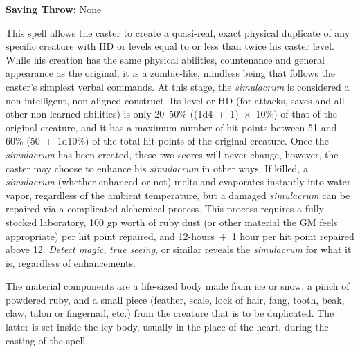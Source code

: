\begin{multicols}{2}
\begin{minipage}{\columnwidth}
\noindent \textbf{Saving Throw:} None

\end{minipage}

This spell allows the caster to create a quasi-real, exact physical duplicate of any specific creature with HD or levels equal to or less than twice his caster level.  While his creation has the same physical abilities, countenance and general appearance as the original, it is a zombie-like, mindless being that follows the caster's simplest verbal commands.  At this stage, the \textit{simulacrum} is considered a non-intelligent, non-aligned construct.  Its level or HD (for attacks, saves and all other non-learned abilities) is only 20--50\% ((1d4~+~1)~$\times$~10\%) of that of the original creature, and it has a maximum number of hit points between 51 and 60\% (50~+~1d10\%) of the total hit points of the original creature.  Once the \textit{simulacrum} has been created, these two scores will never change, however, the caster may choose to enhance his \textit{simulacrum} in other ways.  If killed, a \textit{simulacrum} (whether enhanced or not) melts and evaporates instantly into water vapor, regardless of the ambient temperature, but a damaged \textit{simulacrum} can be repaired via a complicated alchemical process.  This process requires a fully stocked laboratory, 100 gp worth of ruby dust (or other material the GM feels appropriate) per hit point repaired, and 12-hours~+~1 hour per hit point repaired above 12.  \textit{Detect magic}, \textit{true seeing}, or similar reveals the \textit{simulacrum} for what it is, regardless of enhancements.

The material components are a life-sized body made from ice or snow, a pinch of powdered ruby, and a small piece (feather, scale, lock of hair, fang, tooth, beak, claw, talon or fingernail, etc.) from the creature that is to be duplicated.  The latter is set inside the icy body, usually in the place of the heart, during the casting of the spell.


\end{multicols}
